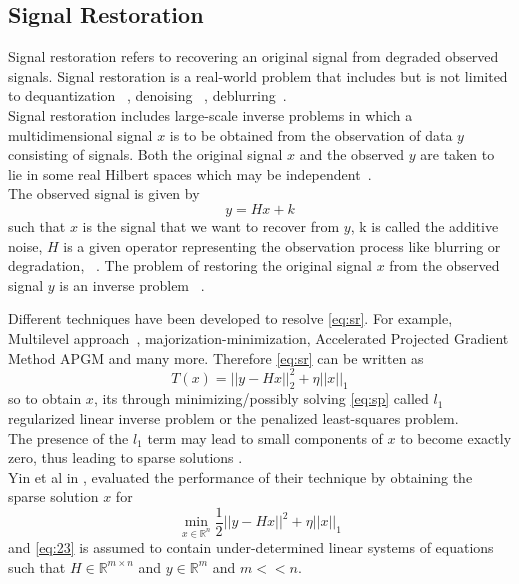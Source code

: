 \documentclass{article}
\newcommand{\R}{\mathbb{R}} %
\theoremstyle{remark}
\begin{document}
{{ 
\subsection{Signal Restoration}
{Signal restoration refers to recovering an original signal from degraded observed signals\cite{chen2024manifold}. Signal restoration is a real-world problem that includes but is not limited to dequantization ~\cite{liu2018graph, liu2016random},  denoising ~\cite{dinesh2020point, pang2017graph, zeng20193d}, deblurring~\cite{bai2018graph, chen2021fast}. \\
Signal restoration includes large-scale inverse problems in which a multidimensional signal $x$ is to be obtained from the observation of
data $y$ consisting of signals.  Both the original signal $x$ and the observed $y$ are taken to lie in some real Hilbert spaces which may be independent~\cite{combettes2005signal, stark2013image}.\\
The observed signal is given by 
\begin{equation}\label{eq:sr}
    y=Hx+k
\end{equation}such that $x$ is the signal that we want to recover from $y$, k is called the additive noise, $H$ is a given operator representing the observation process like blurring or degradation, ~\cite{selesnick2009sparse,soussen2011bernoulli}. 
The problem of restoring the original signal $x$ from the observed signal $y$ is an inverse problem ~\cite{espanol2010multilevel, selesnick2009sparse}. 

Different techniques have been developed to resolve \eqref{eq:sr}. For example, Multilevel approach~\cite{espanol2010multilevel}, majorization-minimization\cite{selesnick2009sparse}, Accelerated Projected Gradient Method  APGM\cite{daubechies2008accelerated}  and many more. Therefore \eqref{eq:sr} can be written as
\begin{equation}\label{eq:sp}
    T(x)= ||y-Hx||_2^2+\eta||x||_1
\end{equation}
so to obtain $x$, its through minimizing/possibly solving \eqref{eq:sp} called $l_1$ regularized linear inverse problem or the  penalized least-squares problem.\\
The presence of the $l_1$ term may lead to small components
of $x$ to become exactly zero, thus leading to sparse solutions
\cite{figueiredo2007gradient}.\\
Yin et al in \cite{yin2023family}, evaluated the performance of their technique by obtaining the sparse solution $x$ for 
\begin{equation}\label{eq:23}
    \min_{x\in \R^n} \frac{1}{2}||y-Hx||^2+\eta||x||_1
\end{equation}
and \eqref{eq:23} is assumed to contain under-determined linear systems of equations such that $H\in \R^{m\times n}$ and $y\in \R^m$ and $m<<n$.

}}}
\end{document}
